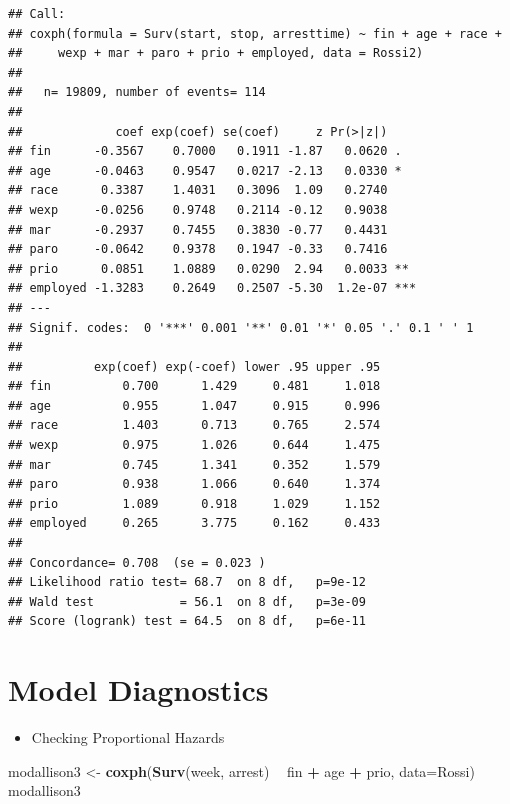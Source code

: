 \documentclass[]{book}
\newenvironment{Shaded}{\begin{snugshade}}{\end{snugshade}}
\newcommand{\DataTypeTok}[1]{\textcolor[rgb]{0.13,0.29,0.53}{#1}}
\newcommand{\KeywordTok}[1]{\textcolor[rgb]{0.13,0.29,0.53}{\textbf{#1}}}
\newcommand{\NormalTok}[1]{#1}
\newcommand{\OperatorTok}[1]{\textcolor[rgb]{0.81,0.36,0.00}{\textbf{#1}}}
\newcommand{\StringTok}[1]{\textcolor[rgb]{0.31,0.60,0.02}{#1}}
\providecommand{\tightlist}{%
  \setlength{\itemsep}{0pt}\setlength{\parskip}{0pt}}
\begin{document}
\begin{verbatim}
## Call:
## coxph(formula = Surv(start, stop, arresttime) ~ fin + age + race + 
##     wexp + mar + paro + prio + employed, data = Rossi2)
## 
##   n= 19809, number of events= 114 
## 
##             coef exp(coef) se(coef)     z Pr(>|z|)    
## fin      -0.3567    0.7000   0.1911 -1.87   0.0620 .  
## age      -0.0463    0.9547   0.0217 -2.13   0.0330 *  
## race      0.3387    1.4031   0.3096  1.09   0.2740    
## wexp     -0.0256    0.9748   0.2114 -0.12   0.9038    
## mar      -0.2937    0.7455   0.3830 -0.77   0.4431    
## paro     -0.0642    0.9378   0.1947 -0.33   0.7416    
## prio      0.0851    1.0889   0.0290  2.94   0.0033 ** 
## employed -1.3283    0.2649   0.2507 -5.30  1.2e-07 ***
## ---
## Signif. codes:  0 '***' 0.001 '**' 0.01 '*' 0.05 '.' 0.1 ' ' 1
## 
##          exp(coef) exp(-coef) lower .95 upper .95
## fin          0.700      1.429     0.481     1.018
## age          0.955      1.047     0.915     0.996
## race         1.403      0.713     0.765     2.574
## wexp         0.975      1.026     0.644     1.475
## mar          0.745      1.341     0.352     1.579
## paro         0.938      1.066     0.640     1.374
## prio         1.089      0.918     1.029     1.152
## employed     0.265      3.775     0.162     0.433
## 
## Concordance= 0.708  (se = 0.023 )
## Likelihood ratio test= 68.7  on 8 df,   p=9e-12
## Wald test            = 56.1  on 8 df,   p=3e-09
## Score (logrank) test = 64.5  on 8 df,   p=6e-11
\end{verbatim}

\hypertarget{model-diagnostics}{%
\section{Model Diagnostics}\label{model-diagnostics}}

\begin{itemize}
\tightlist
\item
  Checking Proportional Hazards
\end{itemize}

\begin{Shaded}
\begin{Highlighting}[]
\NormalTok{modallison3 <-}\StringTok{ }\KeywordTok{coxph}\NormalTok{(}\KeywordTok{Surv}\NormalTok{(week, arrest) }\OperatorTok{~}\StringTok{ }\NormalTok{fin }\OperatorTok{+}\StringTok{ }\NormalTok{age }\OperatorTok{+}\StringTok{ }\NormalTok{prio, }\DataTypeTok{data=}\NormalTok{Rossi)}
\NormalTok{modallison3}
\end{Highlighting}
\end{Shaded}
\end{document}
